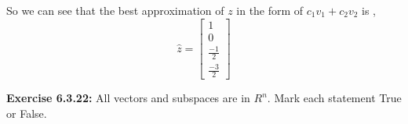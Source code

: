 \documentclass{amsart}
\begin{document}
So we can see that the best approximation of $z$ in the form of $c_1v_1+c_2v_2$ is ,
\begin{equation*}
\hat{z} = 
\begin{bmatrix}
1\\
0\\
\frac{-1}{2}\\
\frac{-3}{2}
\end{bmatrix}
\end{equation*}


\vspace{1in}





\noindent\textbf{Exercise 6.3.22: }All vectors and subspaces are in $R^n$. Mark each statement True or False.\\
\end{document}
